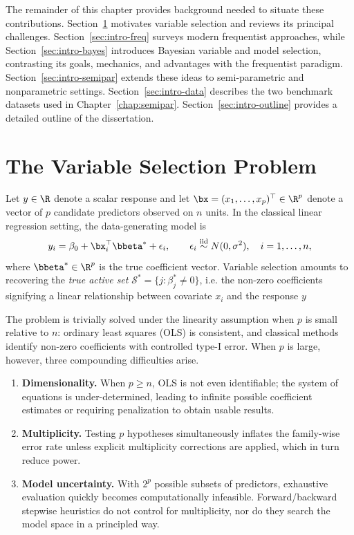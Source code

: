 The remainder of this chapter provides background needed to situate
these contributions. 
Section~\ref{sec:intro-vs} motivates variable selection and reviews its principal challenges.
Section~\ref{sec:intro-freq} surveys modern frequentist approaches, while
Section~\ref{sec:intro-bayes} introduces Bayesian variable and model selection, contrasting its goals, mechanics, and advantages with the frequentist paradigm. Section~\ref{sec:intro-semipar} extends these ideas to semi-parametric and nonparametric settings.
Section~\ref{sec:intro-data} describes the two benchmark datasets used in
Chapter~\ref{chap:semipar}. 
Section~\ref{sec:intro-outline} provides a
detailed outline of the dissertation.

\section{The Variable Selection Problem}
\label{sec:intro-vs}

Let $y \in \R$ denote a scalar response and let
$\bx = (x_1, \ldots, x_p)^{\top} \in \R^p$ denote a vector of $p$ candidate
predictors observed on $n$ units. In the classical linear regression setting, the
data-generating model is
\begin{equation}
  y_i = \beta_0 + \bx_i^{\top}\bbeta^* + \epsilon_i,
  \qquad \epsilon_i \overset{\mathrm{iid}}{\sim} N(0, \sigma^2),
  \quad i = 1,\ldots,n,
  \label{eq:linear-model}
\end{equation}
where $\bbeta^* \in \R^p$ is the true coefficient vector. Variable
selection amounts to recovering the \emph{true active set}
$\mathcal{S}^* = \{j : \beta_j^* \neq 0\}$, i.e. the non-zero coefficients signifying a linear relationship between covariate $x_i$ and the response $y$

The problem is trivially solved under the linearity assumption when $p$ is small relative to $n$: ordinary least squares (OLS) is consistent, and classical methods identify non-zero coefficients with controlled type-I error. When $p$ is large, however, three compounding difficulties arise.

\begin{enumerate}
  \item \textbf{Dimensionality.} When $p \geq n$, OLS is not even identifiable; the system of equations is under-determined, leading to infinite possible coefficient estimates or requiring penalization to obtain usable results.

  \item \textbf{Multiplicity.} Testing $p$ hypotheses simultaneously
  inflates the family-wise error rate unless explicit multiplicity
  corrections are applied, which in turn reduce power.

  \item \textbf{Model uncertainty.} With $2^p$ possible subsets of
  predictors, exhaustive evaluation quickly becomes computationally
  infeasible.  Forward/backward stepwise heuristics do not control for multiplicity, nor do they search the model space in a principled way.
\end{enumerate}

